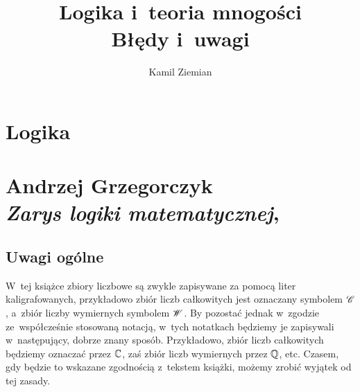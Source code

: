 \documentclass[a4paper,11pt]{article}
\title{Logika i~teoria mnogości \\
  {\Large Błędy i~uwagi}}
\author{Kamil Ziemian}
\numberwithin{equation}{section}
\begin{document}





\maketitle





\section{Logika}














\newpage

\section{Andrzej Grzegorczyk \\
  \textit{Zarys logiki matematycznej},
  \parencite{Grzegorczyk-Zarys-logiki-matematycznej-Pub-1975}}



\subsection{Uwagi ogólne}

\label{ssec:Grzegorczyk-Zarys-ETC-Uwagi-ogolne}


\noindent
W~tej książce zbiory liczbowe są zwykle zapisywane za pomocą liter
kaligrafowanych, przykładowo zbiór liczb całkowitych jest oznaczany symbolem
$\mathcal{C}$, a~zbiór liczby wymiernych symbolem $\mathcal{W}$. By pozostać jednak
w~zgodzie ze~współcześnie stosowaną notacją, w~tych notatkach będziemy je
zapisywali w~następujący, dobrze znany sposób. Przykładowo, zbiór liczb
całkowitych będziemy oznaczać przez $\mathbb{C}$, zaś zbiór liczb
wymiernych przez $\mathbb{Q}$, etc. Czasem, gdy będzie to wskazane zgodnością
z~tekstem książki, możemy zrobić wyjątek od tej zasady.
\end{document}

